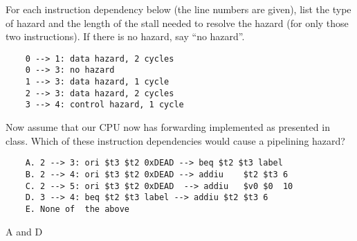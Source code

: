 \begin{blocksection}
\question
For each instruction dependency below (the line numbers are given), list the type of hazard and the length of the stall needed to resolve the hazard (for only those two instructions). If there is no hazard, say “no hazard”.
\begin{solution}
    \begin{verbatim}
    0 --> 1: data hazard, 2 cycles
    0 --> 3: no hazard
    1 --> 3: data hazard, 1 cycle
    2 --> 3: data hazard, 2 cycles
    3 --> 4: control hazard, 1 cycle
    \end{verbatim}
\end{solution}



\question
Now assume that our CPU now has forwarding implemented as presented in class. Which of these instruction dependencies would cause a pipelining hazard?
\begin{verbatim}
    A. 2 --> 3: ori $t3 $t2 0xDEAD --> beq $t2 $t3 label
    B. 2 --> 4: ori	$t3	$t2	0xDEAD --> addiu	$t2	$t3	6
    C. 2 --> 5: ori	$t3	$t2	0xDEAD	--> addiu	$v0	$0	10
    D. 3 --> 4: beq $t2 $t3 label --> addiu $t2 $t3 6
    E. None	of	the	above
\end{verbatim}
\begin{solution}
A and D
\end{solution}

\end{blocksection}